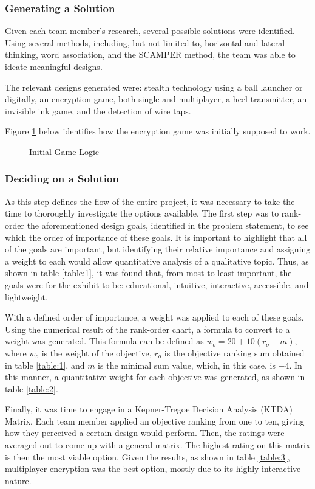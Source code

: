 \documentclass[conference]{IEEEtran}
\begin{document}
\subsubsection{Generating a Solution}

\par Given each team member's research, several possible solutions were identified. Using several methods, including, but not limited to, horizontal and lateral thinking, word association, and the SCAMPER method, the team was able to ideate meaningful designs.
\par The relevant designs generated were: stealth technology using a ball launcher or digitally, an encryption game, both single and multiplayer, a heel transmitter, an invisible ink game, and the detection of wire taps.
\par Figure \ref{fig:1} below identifies how the encryption game was initially supposed to work.

\begin{figure}[H]
  \centering
  
  \caption{Initial Game Logic}
  \label{fig:1}
\end{figure}

\subsubsection{Deciding on a Solution}

\par As this step defines the flow of the entire project, it was necessary to take the time to thoroughly investigate the options available. The first step was to rank-order the aforementioned design goals, identified in the problem statement, to see which the order of importance of these goals. It is important to highlight that all of the goals are important, but identifying their relative importance and assigning a weight to each would allow quantitative analysis of a qualitative topic. Thus, as shown in table \ref{table:1}, it was found that, from most to least important, the goals were for the exhibit to be: educational, intuitive, interactive, accessible, and lightweight. 
\par With a defined order of importance, a weight was applied to each of these goals. Using the numerical result of the rank-order chart, a formula to convert to a weight was generated. This formula can be defined as $w_o = 20 + 10(r_o - m)$, where $w_o$ is the weight of the objective, $r_o$ is the objective ranking sum obtained in table \ref{table:1}, and $m$ is the minimal sum value, which, in this case, is $-4$. In this manner, a quantitative weight for each objective was generated, as shown in table \ref{table:2}. 
\par Finally, it was time to engage in a Kepner-Tregoe Decision Analysis (KTDA) Matrix. Each team member applied an objective ranking from one to ten, giving how they perceived a certain design would perform. Then, the ratings were averaged out to come up with a general matrix. The highest rating on this matrix is then the most viable option. Given the results, as shown in table \ref{table:3}, multiplayer encryption was the best option, mostly due to its highly interactive nature.
\end{document}
